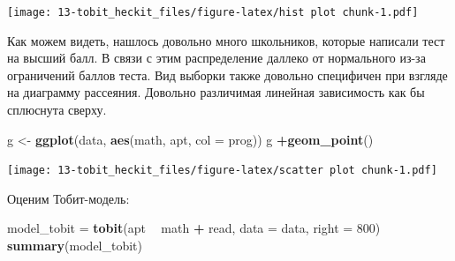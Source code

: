 \documentclass[]{book}
\newenvironment{Shaded}{\begin{snugshade}}{\end{snugshade}}
\newcommand{\CommentTok}[1]{\textcolor[rgb]{0.56,0.35,0.01}{\textit{#1}}}
\newcommand{\ControlFlowTok}[1]{\textcolor[rgb]{0.13,0.29,0.53}{\textbf{#1}}}
\newcommand{\DataTypeTok}[1]{\textcolor[rgb]{0.13,0.29,0.53}{#1}}
\newcommand{\DecValTok}[1]{\textcolor[rgb]{0.00,0.00,0.81}{#1}}
\newcommand{\KeywordTok}[1]{\textcolor[rgb]{0.13,0.29,0.53}{\textbf{#1}}}
\newcommand{\NormalTok}[1]{#1}
\newcommand{\OperatorTok}[1]{\textcolor[rgb]{0.81,0.36,0.00}{\textbf{#1}}}
\newcommand{\StringTok}[1]{\textcolor[rgb]{0.31,0.60,0.02}{#1}}
\begin{document}
\begin{Shaded}
\end{Shaded}

\texttt{[image: 13-tobit\_heckit\_files/figure-latex/hist plot chunk-1.pdf]}

Как можем видеть, нашлось довольно много школьников, которые написали тест на высший балл. В связи с этим распределение даллеко от нормального из-за ограничений баллов теста. Вид выборки также довольно специфичен при взгляде на диаграмму рассеяния. Довольно различимая линейная зависимость как бы сплюснута сверху.

\begin{Shaded}
\begin{Highlighting}[]
\NormalTok{g <-}\StringTok{ }\KeywordTok{ggplot}\NormalTok{(data, }\KeywordTok{aes}\NormalTok{(math, apt, }\DataTypeTok{col =}\NormalTok{ prog))}
\NormalTok{g }\OperatorTok{+}\KeywordTok{geom_point}\NormalTok{()}
\end{Highlighting}
\end{Shaded}

\texttt{[image: 13-tobit\_heckit\_files/figure-latex/scatter plot chunk-1.pdf]}

Оценим Тобит-модель:

\begin{Shaded}
\begin{Highlighting}[]
\NormalTok{model_tobit =}\StringTok{ }\KeywordTok{tobit}\NormalTok{(apt }\OperatorTok{~}\StringTok{ }\NormalTok{math }\OperatorTok{+}\StringTok{ }\NormalTok{read, }\DataTypeTok{data =}\NormalTok{ data, }\DataTypeTok{right =} \DecValTok{800}\NormalTok{)}
\KeywordTok{summary}\NormalTok{(model_tobit)}
\end{Highlighting}
\end{Shaded}
\end{document}
